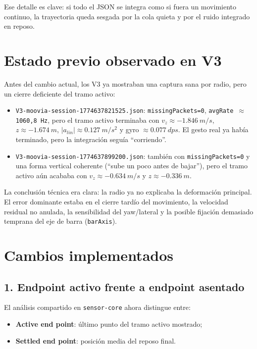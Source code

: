 \documentclass[11pt,a4paper]{article}
\begin{document}
Ese detalle es clave: si todo el JSON se integra como si fuera un movimiento continuo, la trayectoria queda sesgada por la cola quieta y por el ruido integrado en reposo.

\section{Estado previo observado en V3}
Antes del cambio actual, los V3 ya mostraban una captura sana por radio, pero un cierre deficiente del tramo activo:
\begin{itemize}[leftmargin=14pt]
  \item \texttt{V3-moovia-session-1774637821525.json}: \texttt{missingPackets=0}, \texttt{avgRate\,$\approx$\,1060,8 Hz}, pero el tramo activo terminaba con \(v_z \approx \SI{-1,846}{m/s}\), \(z \approx \SI{-1,674}{m}\), \(|a_{lin}| \approx \SI{0,127}{m/s^2}\) y gyro \(\approx \SI{0,077}{dps}\). El gesto real ya hab\'ia terminado, pero la integraci\'on segu\'ia ``corriendo''.
  \item \texttt{V3-moovia-session-1774637899200.json}: tambi\'en con \texttt{missingPackets=0} y una forma vertical coherente (``sube un poco antes de bajar''), pero el tramo activo a\'un acababa con \(v_z \approx \SI{-0,634}{m/s}\) y \(z \approx \SI{-0,336}{m}\).
\end{itemize}

La conclusi\'on t\'ecnica era clara: la radio ya no explicaba la deformaci\'on principal. El error dominante estaba en el cierre tard\'io del movimiento, la velocidad residual no anulada, la sensibilidad del yaw/lateral y la posible fijaci\'on demasiado temprana del eje de barra (\texttt{barAxis}).

\section{Cambios implementados}
\subsection*{1. Endpoint activo frente a endpoint asentado}
El an\'alisis compartido en \texttt{sensor-core} ahora distingue entre:
\begin{itemize}[leftmargin=14pt]
  \item \textbf{Active end point}: \'ultimo punto del tramo activo mostrado;
  \item \textbf{Settled end point}: posici\'on media del reposo final.
\end{itemize}
\end{document}
